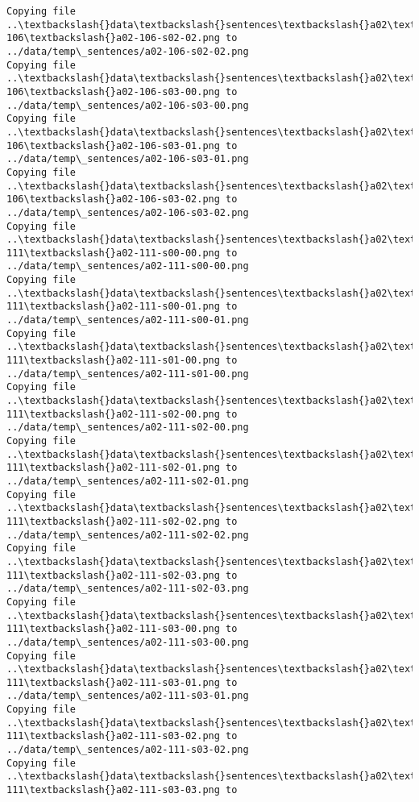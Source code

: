 \documentclass[11pt]{article}
\begin{document}
\begin{Verbatim}[commandchars=\\\{\}]
Copying file ..\textbackslash{}data\textbackslash{}sentences\textbackslash{}a02\textbackslash{}a02-106\textbackslash{}a02-106-s02-02.png to
../data/temp\_sentences/a02-106-s02-02.png
Copying file ..\textbackslash{}data\textbackslash{}sentences\textbackslash{}a02\textbackslash{}a02-106\textbackslash{}a02-106-s03-00.png to
../data/temp\_sentences/a02-106-s03-00.png
Copying file ..\textbackslash{}data\textbackslash{}sentences\textbackslash{}a02\textbackslash{}a02-106\textbackslash{}a02-106-s03-01.png to
../data/temp\_sentences/a02-106-s03-01.png
Copying file ..\textbackslash{}data\textbackslash{}sentences\textbackslash{}a02\textbackslash{}a02-106\textbackslash{}a02-106-s03-02.png to
../data/temp\_sentences/a02-106-s03-02.png
Copying file ..\textbackslash{}data\textbackslash{}sentences\textbackslash{}a02\textbackslash{}a02-111\textbackslash{}a02-111-s00-00.png to
../data/temp\_sentences/a02-111-s00-00.png
Copying file ..\textbackslash{}data\textbackslash{}sentences\textbackslash{}a02\textbackslash{}a02-111\textbackslash{}a02-111-s00-01.png to
../data/temp\_sentences/a02-111-s00-01.png
Copying file ..\textbackslash{}data\textbackslash{}sentences\textbackslash{}a02\textbackslash{}a02-111\textbackslash{}a02-111-s01-00.png to
../data/temp\_sentences/a02-111-s01-00.png
Copying file ..\textbackslash{}data\textbackslash{}sentences\textbackslash{}a02\textbackslash{}a02-111\textbackslash{}a02-111-s02-00.png to
../data/temp\_sentences/a02-111-s02-00.png
Copying file ..\textbackslash{}data\textbackslash{}sentences\textbackslash{}a02\textbackslash{}a02-111\textbackslash{}a02-111-s02-01.png to
../data/temp\_sentences/a02-111-s02-01.png
Copying file ..\textbackslash{}data\textbackslash{}sentences\textbackslash{}a02\textbackslash{}a02-111\textbackslash{}a02-111-s02-02.png to
../data/temp\_sentences/a02-111-s02-02.png
Copying file ..\textbackslash{}data\textbackslash{}sentences\textbackslash{}a02\textbackslash{}a02-111\textbackslash{}a02-111-s02-03.png to
../data/temp\_sentences/a02-111-s02-03.png
Copying file ..\textbackslash{}data\textbackslash{}sentences\textbackslash{}a02\textbackslash{}a02-111\textbackslash{}a02-111-s03-00.png to
../data/temp\_sentences/a02-111-s03-00.png
Copying file ..\textbackslash{}data\textbackslash{}sentences\textbackslash{}a02\textbackslash{}a02-111\textbackslash{}a02-111-s03-01.png to
../data/temp\_sentences/a02-111-s03-01.png
Copying file ..\textbackslash{}data\textbackslash{}sentences\textbackslash{}a02\textbackslash{}a02-111\textbackslash{}a02-111-s03-02.png to
../data/temp\_sentences/a02-111-s03-02.png
Copying file ..\textbackslash{}data\textbackslash{}sentences\textbackslash{}a02\textbackslash{}a02-111\textbackslash{}a02-111-s03-03.png to

\end{Verbatim}
\end{document}
